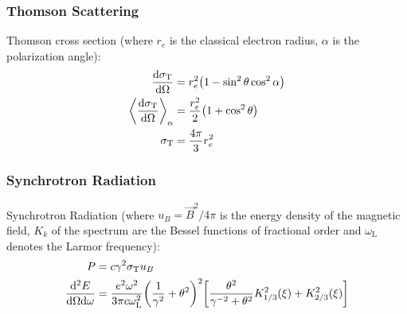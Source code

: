 		\subsubsection{Thomson Scattering}
			Thomson cross section (where $r_e$ is the classical electron radius, $\alpha$ is the polarization angle):
			\begin{equation}
				\begin{aligned}
					\dv{\sigma_\text{T}}{\Omega} &= r_e^2 \qty(1-\sin^2 \theta \cos^2 \alpha) \\
					\left\langle \dv{\sigma_\text{T}}{\Omega} \right\rangle_{\alpha} &= \frac{r_e^2}{2} \qty(1+\cos^2 \theta) \\
					\sigma_\text{T} &= \frac{4\pi}{3}r_e^2 \\
				\end{aligned}
			\end{equation}

		\subsubsection{Synchrotron Radiation}
			\noindent
			Synchrotron Radiation (where $u_B=\vec{B}^2/4\pi$ is the energy density of the magnetic field, $K_k$ of the spectrum are the Bessel functions of fractional order and $\omega_\text{L}$ denotes the Larmor frequency):
			\begin{equation}
				\begin{aligned}
					P &= c \gamma^2 \sigma_\text{T} u_B \\
					\frac{\dd^2 E}{\dd\Omega\dd\omega} &= \frac{e^2 \omega^2}{3\pi c\omega_\text{L}^2} \qty(\frac{1}{\gamma^2} + \theta^2)^2\qty[\frac{\theta^2}{\gamma^{-2}+\theta^2} K_{1/3}^2(\xi) + K_{2/3}^2(\xi)]\\ 
				\end{aligned}
			\end{equation}

